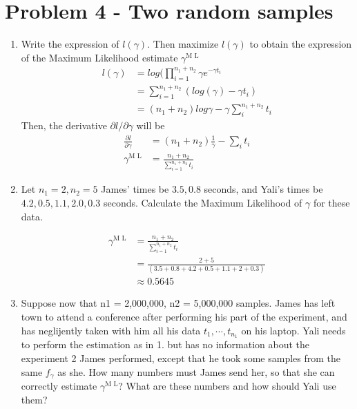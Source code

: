 \documentclass[preprint,12pt]{elsarticle}
\begin{document}
    \section{Problem 4 - Two random samples}
    \begin{enumerate}
        \item Write the expression of $l(\gamma)$. Then maximize $l(\gamma)$
        to obtain the expression of the Maximum Likelihood estimate $\gamma^{\text{M L}}$
        \begin{align*}
            l(\gamma)   &= log (\prod_{i=1}^{n_1+n_2} \gamma e^{-\gamma t_i}\\
                        &= \sum_{i=1}^{n_1+n_2} (log(\gamma) - \gamma t_i)\\
                        &= (n_1+n_2)log\gamma - \gamma \sum_{i}^{n_1+n_2}t_i
        \end{align*}
        Then, the derivative $\partial l/\partial \gamma$ will be
        \begin{align*}
            \frac{\partial l}{\partial \gamma}  
            &= (n_1+n_2)\frac{1}{\gamma} - \sum_{i} t_i\\
            \gamma^{\text{M L}} &= \frac{n_1+n_2}{\sum_{i=1}^{n_1+n_2}t_i}
        \end{align*}
        
        \item Let $n_1=2, n_2=5$ James' times be $3.5, 0.8$ seconds, 
        and Yali's times be $4.2, 0.5, 1.1, 2.0, 0.3$ seconds. Calculate the 
        Maximum Likelihood of $\gamma$ for these data.

        \begin{align*}
            \gamma^{\text{M L}} &= \frac{n_1+n_2}{\sum_{i=1}^{n_1+n_2}t_i}\\
                                &= \frac{2+5}{(3.5+0.8+4.2+0.5+1.1+2+0.3)}\\
                                &\approx 0.5645
        \end{align*}

        \item Suppose now that n1 = 2,000,000, n2 = 5,000,000 samples. 
        James has left town to attend a conference after performing his part of 
        the experiment, and has neglijently taken with him all his data 
        $t_1,\cdots,t_{n_1}$ on his laptop. Yali needs to perform the 
        estimation as in 1. but has no information about the experiment
        2 James performed, except that he took some samples from the same 
        $f_{\gamma}$ as she. How many numbers must James send her, so that she can 
        correctly estimate $\gamma^{\text{M L}}$? What are these numbers 
        and how should Yali use them?\\


\end{enumerate}
\end{document}
